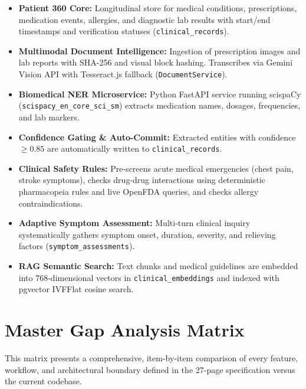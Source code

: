 \documentclass[11pt,a4paper]{article}
\begin{document}
\begin{itemize}[leftmargin=1.5em]
    \item \textbf{Patient 360 Core:} Longitudinal store for medical conditions, prescriptions, medication events, allergies, and diagnostic lab results with start/end timestamps and verification statuses (\texttt{clinical\_records}).
    \item \textbf{Multimodal Document Intelligence:} Ingestion of prescription images and lab reports with SHA-256 and visual block hashing. Transcribes via Gemini Vision API with Tesseract.js fallback (\texttt{DocumentService}).
    \item \textbf{Biomedical NER Microservice:} Python FastAPI service running scispaCy (\texttt{scispacy\_en\_core\_sci\_sm}) extracts medication names, dosages, frequencies, and lab markers.
    \item \textbf{Confidence Gating \& Auto-Commit:} Extracted entities with confidence $\ge 0.85$ are automatically written to \texttt{clinical\_records}.
    \item \textbf{Clinical Safety Rules:} Pre-screens acute medical emergencies (chest pain, stroke symptoms), checks drug-drug interactions using deterministic pharmacopeia rules and live OpenFDA queries, and checks allergy contraindications.
    \item \textbf{Adaptive Symptom Assessment:} Multi-turn clinical inquiry systematically gathers symptom onset, duration, severity, and relieving factors (\texttt{symptom\_assessments}).
    \item \textbf{RAG Semantic Search:} Text chunks and medical guidelines are embedded into 768-dimensional vectors in \texttt{clinical\_embeddings} and indexed with pgvector IVFFlat cosine search.
\end{itemize}

\newpage

\section{Master Gap Analysis Matrix}

This matrix presents a comprehensive, item-by-item comparison of every feature, workflow, and architectural boundary defined in the 27-page specification versus the current codebase.
\end{document}
